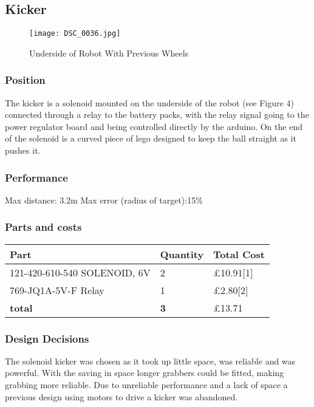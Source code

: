 \subsection{Kicker}
\begin{figure}[!ht]
\caption{Underside of Robot With Previous Wheels}
\centering
\texttt{[image: DSC\_0036.jpg]}
\end{figure}
\subsubsection{Position}
The kicker is a solenoid mounted on the underside of the robot (see Figure 4) connected through a relay to the battery packs, with the relay signal going to the power regulator board and being controlled directly by the arduino. On the end of the solenoid is a curved piece of lego designed to keep the ball straight as it pushes it.

\subsubsection{Performance}
Max distance: 3.2m 
Max error (radius of target):15\%

\subsubsection{Parts and costs}
\begin{center}
\begin{tabular}{ | m{3cm} | m{3cm}| m{6cm} | }
\hline
\textbf{Part} & \textbf{Quantity} & \textbf{Total Cost} \\
\hline
121-420-610-540  SOLENOID, 6V & 2 &  £10.91[1] \\
\hline
769-JQ1A-5V-F Relay & 1 &  £2.80[2] \\
\hline
\textbf{total} & \textbf{3} & £13.71 \\
\hline
\end{tabular}
\end{center}

\subsubsection{Design Decisions}
The solenoid kicker was chosen as it took up little space, was reliable and was powerful. With the saving in space longer grabbers could be fitted, making grabbing more reliable. Due to unreliable performance and a lack of space a previous design using motors to drive a kicker was abandoned.


